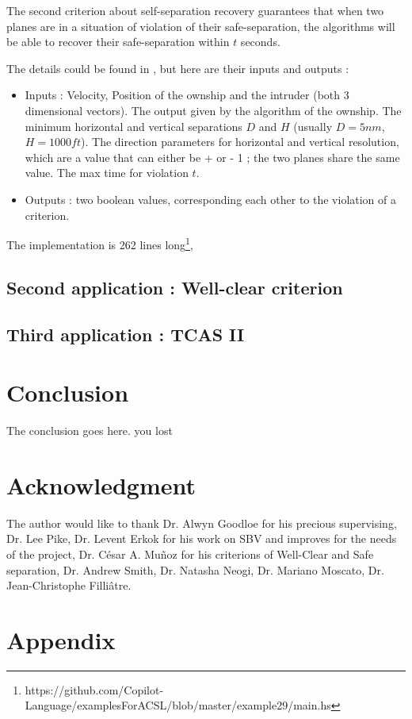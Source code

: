 \documentclass[a4paper,11pt,final]{article}
\begin{document}
  The second criterion about self-separation recovery guarantees that when two planes are in a situation of violation of their safe-separation, the algorithms will be able to recover their safe-separation within $t$ seconds.
  
  The details could be found in \cite{MBNMH2010NASA}, but here are their inputs and outputs :
  \begin{itemize}
  	\item Inputs : Velocity, Position of the ownship and the intruder (both 3 dimensional vectors). The output given by the algorithm of the ownship. The minimum horizontal and vertical separations $D$ and $H$ (usually $D = 5nm$, $H=1000ft$). The direction parameters for horizontal and vertical resolution, which are a value that can either be + or - 1 ; the two planes share the same value. The max time for violation $t$.
  	\item Outputs : two boolean values, corresponding each other to the violation of a criterion.
  \end{itemize}
  
  The implementation is 262 lines long\footnote{https://github.com/Copilot-Language/examplesForACSL/blob/master/example29/main.hs}, 
  
  \subsection{Second application : Well-clear criterion}
  \subsection{Third application : TCAS II}
  
  \section*{Conclusion}
  The conclusion goes here.
  you lost 
  

  \cleardoublepage{}
  
  
  
  
  \section*{Acknowledgment}
  
  The author would like to thank Dr. Alwyn Goodloe for his precious supervising, Dr. Lee Pike, Dr. Levent Erkok for his work on SBV and improves for the needs of the project, Dr. César A. Muñoz for his criterions of Well-Clear and Safe separation, Dr. Andrew Smith, Dr. Natasha Neogi, Dr. Mariano Moscato, Dr. Jean-Christophe Filliâtre.
  
  
  \section*{Appendix}
  
\end{document}
